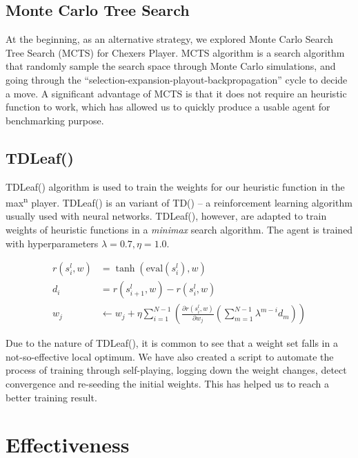 \documentclass[12pt,a4paper]{article}
\newcommand{\maxn}{max\textsuperscript{n}}
\newcommand{\TDLeaf}{TDLeaf(\textlambda)}
\begin{document}
\subsection{Monte Carlo Tree Search} \label{mcts}
At the beginning, as an alternative strategy, we explored Monte Carlo Search 
Tree Search (MCTS) for Chexers Player. MCTS algorithm \cite{Nijssen2013}
is a search algorithm that randomly sample the search space through Monte
Carlo simulations, and going through the 
``selection-expansion-playout-backpropagation'' cycle to decide a move.
A significant advantage of MCTS is that it does not require an heuristic 
function to work, which has allowed us to quickly produce a usable agent
for benchmarking purpose.

\subsection{\TDLeaf} \label{tdleaf}

\TDLeaf{} algorithm is used to train the weights for our heuristic function
in the \maxn{} player. \TDLeaf{} \cite{Baxter1999} is an variant of 
TD(\textlambda) -- a reinforcement learning algorithm usually used with 
neural networks. \TDLeaf{}, however, are adapted to train weights of 
heuristic functions in a \textit{minimax} search algorithm. The agent is 
trained with hyperparameters $\lambda = 0.7, \eta = 1.0$.

\begin{align}
    r(s_i^l, w) & = \tanh(\text{eval}(s_i^l), w)\\
    d_i & = r(s_{i+1}^l, w) - r(s_i^l, w) \\ 
    w_j & \leftarrow w_j + \eta \sum_{i=1}^{N-1} 
    \left(
        \frac{\partial r(s_i^l, w)}{\partial w_j}
        \left(
            \sum_{m=1}^{N-1} \lambda^{m-i} d_m
        \right)
    \right)
\end{align}

Due to the nature of \TDLeaf{}, it is common to see that a weight set falls 
in a not-so-effective local optimum. We have also created a script to 
automate the process of training through self-playing, logging down the weight 
changes, detect convergence and re-seeding the initial weights. This has 
helped us to reach a better training result.

\section{Effectiveness}
\end{document}
